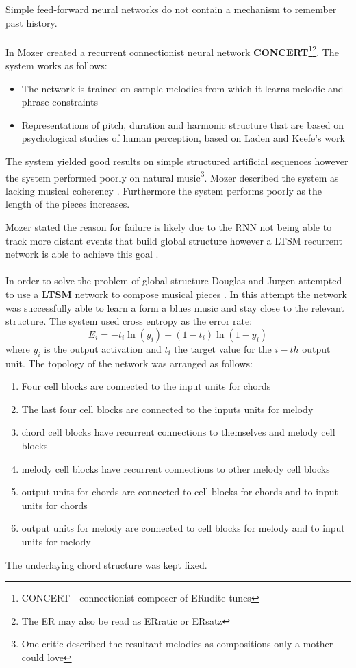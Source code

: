 Simple feed-forward neural networks do not contain a mechanism to remember past history.  
\\
\\
In \cite{mozer1994neural} Mozer created a recurrent connectionist neural network \textbf{CONCERT}\footnote{CONCERT - connectionist composer of ERudite tunes}\footnote{The ER may also be read as ERratic or ERsatz}.
The system works as follows:
\begin{itemize}
\item The network is trained on sample melodies from which it learns melodic and phrase constraints
\item Representations of pitch, duration and harmonic structure that are based on psychological studies of human perception, based on Laden and Keefe's work \cite{laden1989representation}
\end{itemize}
The system yielded good results on simple structured artificial sequences however the system performed poorly on natural music\footnote{One critic described the resultant melodies as compositions only a mother could love}. Mozer described the system as lacking musical coherency \cite{mozer1994neural}. Furthermore the system performs poorly as the length of the pieces increases.

Mozer stated the reason for failure is likely due to the \ac{RNN} not being able to track more distant events that build global structure \cite{mozer1994neural} however a \ac{LTSM} recurrent network is able to achieve this goal \cite{Eck2002}.
\\
\\
In order to solve the problem of global structure Douglas and Jurgen attempted to use a \textbf{\ac{LTSM}} network to compose musical pieces \cite{Eck2002}. In this attempt the network was successfully able to learn a form a blues music and stay close to the relevant structure.
The system used cross entropy as the error rate:
\[
E_i = -t_i \ln(y_i) - (1-t_i)\ln (1-y_i) \]
where $y_i$ is the output activation and $t_i$ the target value for the $i-th$ output unit.
The topology of the network was arranged as follows:
\begin{enumerate}
\item Four cell blocks are connected to the input units for chords
\item The last four cell blocks are connected to the inputs units for melody
\item chord cell blocks have recurrent connections to themselves and melody cell blocks
\item melody cell blocks have recurrent connections to other melody cell blocks
\item output units for chords are connected to cell blocks for chords and to input units for chords
\item output units for melody are connected to cell blocks for melody and to input units for melody
\end{enumerate}
The underlaying chord structure was kept fixed.

